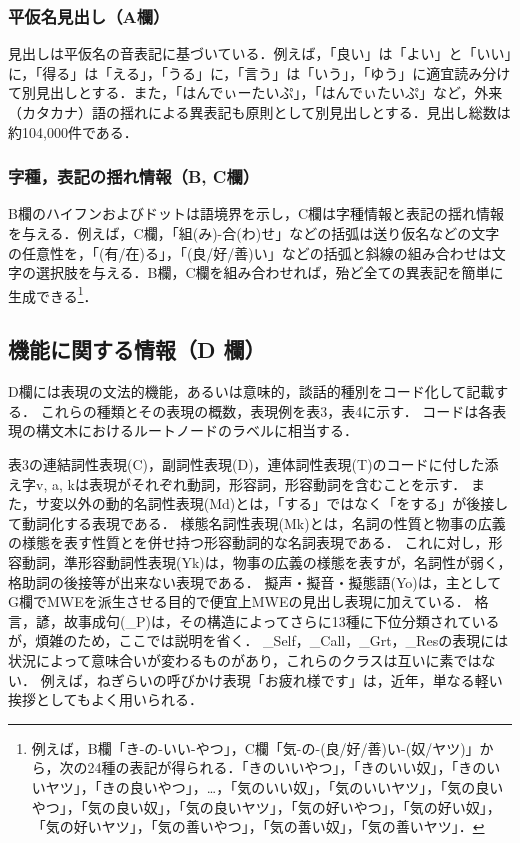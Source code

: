 \documentclass[japanese]{jnlp_1.4}
\begin{document}
\subsubsection{平仮名見出し（A欄）}

見出しは平仮名の音表記に基づいている．例えば，「良い」は「よい」と「いい」に，「得る」は「える」，「うる」に，「言う」は「いう」，「ゆう」に適宜読み分けて別見出しとする．また，「はんでぃーたいぷ」，「はんでぃたいぷ」など，外来（カタカナ）語の揺れによる異表記も原則として別見出しとする．見出し総数は約104,000件である．

\subsubsection{字種，表記の揺れ情報（B, C欄）}

B欄のハイフンおよびドットは語境界を示し，C欄は字種情報と表記の揺れ情報を与える．例えば，C欄，「組(み)-合(わ)せ」などの括弧は送り仮名などの文字の任意性を，「(有/在)る」，「(良/好/善)い」などの括弧と斜線の組み合わせは文字の選択肢を与える．B欄，C欄を組み合わせれば，殆ど全ての異表記を簡単に生成できる\footnote{例えば，B欄「き-の-いい-やつ」，C欄「気-の-(良/好/善)い-(奴/ヤツ)」から，次の24種の表記が得られる．「きのいいやつ」，「きのいい奴」，「きのいいヤツ」，「きの良いやつ」，…，「気のいい奴」，「気のいいヤツ」，「気の良いやつ」，「気の良い奴」，「気の良いヤツ」，「気の好いやつ」，「気の好い奴」，「気の好いヤツ」，「気の善いやつ」，「気の善い奴」，「気の善いヤツ」．}．


\subsection{機能に関する情報\protect\normalsize{（D 欄）}}

D欄には表現の文法的機能，あるいは意味的，談話的種別をコード化して記載する．
これらの種類とその表現の概数，表現例を表3，表4に示す．
コードは各表現の構文木におけるルートノードのラベルに相当する．

表3の連結詞性表現(C)，副詞性表現(D)，連体詞性表現(T)のコードに付した添え字v, a, kは表現がそれぞれ動詞，形容詞，形容動詞を含むことを示す．
また，サ変以外の動的名詞性表現(Md)とは，「する」ではなく「をする」が後接して動詞化する表現である．
様態名詞性表現(Mk)とは，名詞の性質と物事の広義の様態を表す性質とを併せ持つ形容動詞的な名詞表現である．
これに対し，形容動詞，準形容動詞性表現(Yk)は，物事の広義の様態を表すが，名詞性が弱く，格助詞の後接等が出来ない表現である．
擬声・擬音・擬態語(Yo)は，主としてG欄でMWEを派生させる目的で便宜上MWEの見出し表現に加えている．
格言，諺，故事成句(\_P)は，その構造によってさらに13種に下位分類されているが，煩雑のため，ここでは説明を省く．
\_Self，\_Call，\_Grt，\_Resの表現には状況によって意味合いが変わるものがあり，これらのクラスは互いに素ではない．
例えば，ねぎらいの呼びかけ表現「お疲れ様です」は，近年，単なる軽い挨拶としてもよく用いられる．
\end{document}
